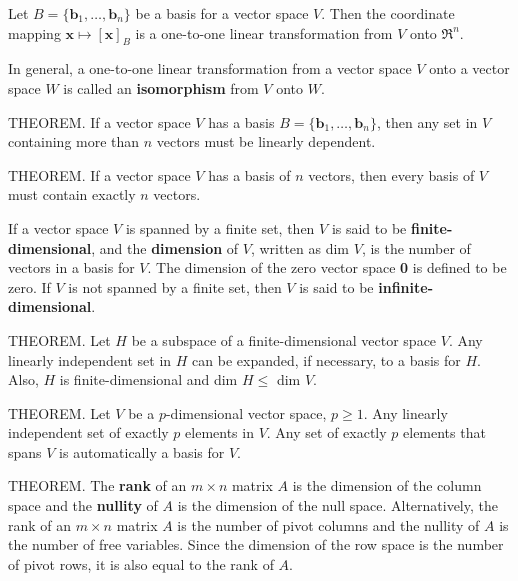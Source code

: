 \documentclass{article}
\begin{document}
\hfill \newline Let $B = \{\textbf{b}_1,\dots,\textbf{b}_n\}$ be a basis for a vector space $V$. Then the coordinate mapping $\textbf{x} \mapsto [\textbf{x}]_B$ is a one-to-one linear transformation from $V$ onto $\Re^n$.

\hfill \newline In general, a one-to-one linear transformation from a vector space $V$ onto a vector space $W$ is called an \textbf{isomorphism} from $V$ onto $W$.

\hfill \newline THEOREM. If a vector space $V$ has a basis $B = \{\textbf{b}_1,\dots,\textbf{b}_n\}$, then any set in $V$ containing more than $n$ vectors must be linearly dependent.

\hfill \newline THEOREM. If a vector space $V$ has a basis of $n$ vectors, then every basis of $V$ must contain exactly $n$ vectors.

\hfill \newline If a vector space $V$ is spanned by a finite set, then $V$ is said to be \textbf{finite-dimensional}, and the \textbf{dimension} of $V$, written as dim $V$, is the number of vectors in a basis for $V$. The dimension of the zero vector space {\textbf{0}} is defined to be zero. If $V$ is not spanned by a finite set, then $V$ is said to be \textbf{infinite-dimensional}.

\hfill \newline THEOREM. Let $H$ be a subspace of a finite-dimensional vector space $V$. Any linearly independent set in $H$ can be expanded, if necessary, to a basis for $H$. Also, $H$ is finite-dimensional and dim $H \leq$ dim $V$. 

\hfill \newline THEOREM. Let $V$ be a $p$-dimensional vector space, $p \geq1$. Any linearly independent set of exactly $p$ elements in $V$. Any set of exactly $p$ elements that spans $V$ is automatically a basis for $V$.

\hfill \newline THEOREM. The \textbf{rank} of an $m \times n$ matrix $A$ is the dimension of the column space and the \textbf{nullity} of $A$ is the dimension of the null space. Alternatively, the rank of an $m \times n$ matrix $A$ is the number of pivot columns and the nullity of $A$ is the number of free variables. Since the dimension of the row space is the number of pivot rows, it is also equal to the rank of $A$.
\end{document}
